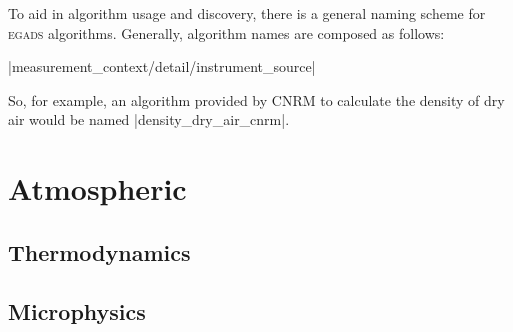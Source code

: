 \documentclass[a4paper,11pt]{report}
\newcommand{\egads}{\textsc{egads} }
\begin{document}
To aid in algorithm usage and discovery, there is a general naming scheme for \egads algorithms. Generally, algorithm names are composed as follows: 

|{measurement}_{context/detail/instrument}_{source}| 

So, for example, an algorithm provided by CNRM to calculate the density of dry air would be named |density_dry_air_cnrm|.




\part{Atmospheric}

\chapter{Thermodynamics}



























\chapter{Microphysics}
\end{document}
